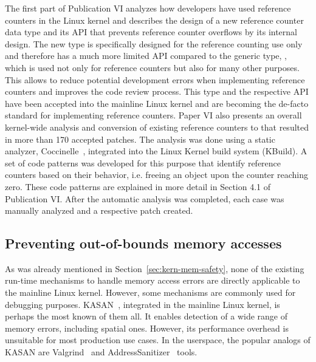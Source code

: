 The first part of Publication VI analyzes how developers have used reference counters in the Linux kernel and describes the design of a new reference counter data type  and its API that prevents reference counter overflows by its internal design. 
The new type is specifically designed for the reference counting use only and therefore has a much more limited API compared to the generic type, , which is used not only for reference counters but also for many other purposes. This allows to reduce potential development errors when implementing reference counters and improves the code review process.   
This type and the respective API have been accepted into the mainline Linux kernel and are becoming the de-facto standard for implementing reference counters. 
Paper VI also presents an overall kernel-wide analysis and conversion of existing reference counters to  that resulted in more than 170 accepted patches. The analysis was done using a static analyzer, Coccinelle~\cite{coccinelle}, integrated into the Linux Kernel build system (KBuild). A set of code patterns was developed for this purpose that identify reference counters based on their behavior, i.e. freeing an object upon the counter reaching zero. These code patterns are explained in more detail in Section 4.1 of Publication VI. After the automatic analysis was completed, each case was manually analyzed and a respective patch created. 


\subsection{Preventing out-of-bounds memory accesses}
\label{sec:kern-mem-out-of-bounds}

As was already mentioned in Section~\ref{sec:kern-mem-safety}, none of the existing run-time mechanisms to handle memory access errors are directly applicable to the mainline Linux kernel. However, some mechanisms are commonly used for debugging purposes.
KASAN~\cite{kasan}, integrated in the mainline Linux kernel, is perhaps the most known of them all. It enables detection of a wide range of memory errors, including spatial ones. However, its performance overhead is unsuitable for most production use cases.
In the userspace, the popular analogs of KASAN are Valgrind~\cite{nethercote2007valgrind} and AddressSanitizer~\cite{serebryany2012addresssanitizer} tools. 

